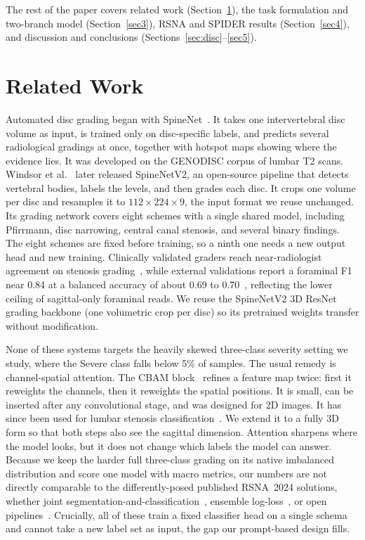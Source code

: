 \documentclass[runningheads]{llncs}
\begin{document}
The rest of the paper covers related work (Section~\ref{sec2}), the task formulation and two-branch model (Section~\ref{sec3}), RSNA and SPIDER results (Section~\ref{sec4}), and discussion and conclusions (Sections~\ref{sec:disc}--\ref{sec5}).

\section{Related Work}\label{sec2}

Automated disc grading began with SpineNet~\cite{jamaludin2017}. It takes one intervertebral disc volume as input, is trained only on disc-specific labels, and predicts several radiological gradings at once, together with hotspot maps showing where the evidence lies. It was developed on the GENODISC corpus of lumbar T2 scans. Windsor et al.~\cite{windsor2022} later released SpineNetV2, an open-source pipeline that detects vertebral bodies, labels the levels, and then grades each disc. It crops one volume per disc and resamples it to $112\times224\times9$, the input format we reuse unchanged. Its grading network covers eight schemes with a single shared model, including Pfirrmann, disc narrowing, central canal stenosis, and several binary findings. The eight schemes are fixed before training, so a ninth one needs a new output head and new training. Clinically validated graders reach near-radiologist agreement on stenosis grading~\cite{hallinan2021}, while external validations report a foraminal F1 near 0.84 at a balanced accuracy of about 0.69 to 0.70~\cite{mcsweeney2023,nigru2024}, reflecting the lower ceiling of sagittal-only foraminal reads. We reuse the SpineNetV2 3D ResNet grading backbone (one volumetric crop per disc) so its pretrained weights transfer without modification.

None of these systems targets the heavily skewed three-class severity setting we study, where the Severe class falls below 5\% of samples. The usual remedy is channel-spatial attention. The CBAM block~\cite{woo2018cbam} refines a feature map twice: first it reweights the channels, then it reweights the spatial positions. It is small, can be inserted after any convolutional stage, and was designed for 2D images. It has since been used for lumbar stenosis classification~\cite{lin2024cbam}. We extend it to a fully 3D form so that both steps also see the sagittal dimension. Attention sharpens where the model looks, but it does not change which labels the model can answer. Because we keep the harder full three-class grading on its native imbalanced distribution and score one model with macro metrics, our numbers are not directly comparable to the differently-posed published RSNA~2024 solutions, whether joint segmentation-and-classification~\cite{aktan2025}, ensemble log-loss~\cite{kaggle2024}, or open pipelines~\cite{nshen2024}. Crucially, all of these train a fixed classifier head on a single schema and cannot take a new label set as input, the gap our prompt-based design fills.
\end{document}
